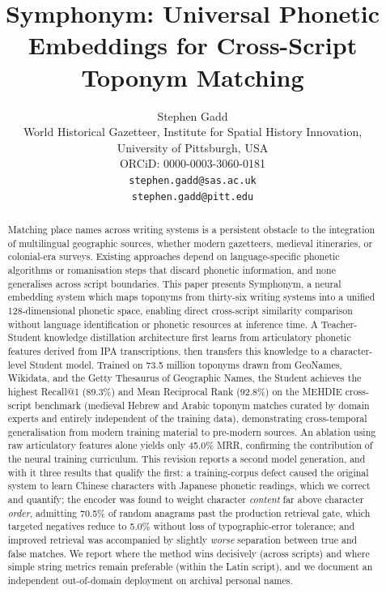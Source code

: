 \documentclass[11pt,a4paper]{article}
\title{Symphonym: Universal Phonetic Embeddings for Cross-Script Toponym Matching}
\author{Stephen Gadd\\
\small World Historical Gazetteer, Institute for Spatial History Innovation,\\
\small University of Pittsburgh, USA\\
\small ORCiD: 0000-0003-3060-0181\\
\small \texttt{stephen.gadd@sas.ac.uk}\\
\small \texttt{stephen.gadd@pitt.edu}}
\date{}
\begin{document}
\maketitle

\begin{abstract}
Matching place names across writing systems is a persistent obstacle to the integration of multilingual geographic sources, whether modern gazetteers, medieval itineraries, or colonial-era surveys. Existing approaches depend on language-specific phonetic algorithms or romanisation steps that discard phonetic information, and none generalises across script boundaries. This paper presents Symphonym, a neural embedding system which maps toponyms from thirty-six writing systems into a unified 128-dimensional phonetic space, enabling direct cross-script similarity comparison without language identification or phonetic resources at inference time. A Teacher-Student knowledge distillation architecture first learns from articulatory phonetic features derived from IPA transcriptions, then transfers this knowledge to a character-level Student model. Trained on 73.5 million toponyms drawn from GeoNames, Wikidata, and the Getty Thesaurus of Geographic Names, the Student achieves the highest Recall@1 (89.3\%) and Mean Reciprocal Rank (92.8\%) on the MEHDIE cross-script benchmark (medieval Hebrew and Arabic toponym matches curated by domain experts and entirely independent of the training data), demonstrating cross-temporal generalisation from modern training material to pre-modern sources. An ablation using raw articulatory features alone yields only 45.0\% MRR, confirming the contribution of the neural training curriculum. This revision reports a second model generation, and with it three results that qualify the first: a training-corpus defect caused the original system to learn Chinese characters with Japanese phonetic readings, which we correct and quantify; the encoder was found to weight character \emph{content} far above character \emph{order}, admitting 70.5\% of random anagrams past the production retrieval gate, which targeted negatives reduce to 5.0\% without loss of typographic-error tolerance; and improved retrieval was accompanied by slightly \emph{worse} separation between true and false matches. We report where the method wins decisively (across scripts) and where simple string metrics remain preferable (within the Latin script), and we document an independent out-of-domain deployment on archival personal names.
\end{abstract}
\end{document}
